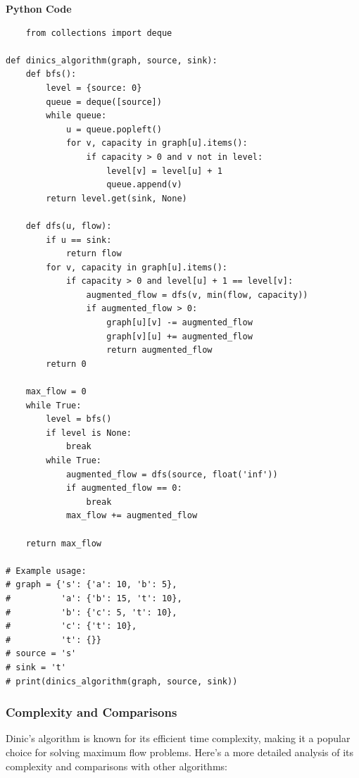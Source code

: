 \documentclass[12pt]{book} %
\begin{document}
\textbf{Python Code}
\FloatBarrier
\begin{lstlisting}
    from collections import deque

def dinics_algorithm(graph, source, sink):
    def bfs():
        level = {source: 0}
        queue = deque([source])
        while queue:
            u = queue.popleft()
            for v, capacity in graph[u].items():
                if capacity > 0 and v not in level:
                    level[v] = level[u] + 1
                    queue.append(v)
        return level.get(sink, None)

    def dfs(u, flow):
        if u == sink:
            return flow
        for v, capacity in graph[u].items():
            if capacity > 0 and level[u] + 1 == level[v]:
                augmented_flow = dfs(v, min(flow, capacity))
                if augmented_flow > 0:
                    graph[u][v] -= augmented_flow
                    graph[v][u] += augmented_flow
                    return augmented_flow
        return 0

    max_flow = 0
    while True:
        level = bfs()
        if level is None:
            break
        while True:
            augmented_flow = dfs(source, float('inf'))
            if augmented_flow == 0:
                break
            max_flow += augmented_flow

    return max_flow

# Example usage:
# graph = {'s': {'a': 10, 'b': 5},
#          'a': {'b': 15, 't': 10},
#          'b': {'c': 5, 't': 10},
#          'c': {'t': 10},
#          't': {}}
# source = 's'
# sink = 't'
# print(dinics_algorithm(graph, source, sink))
\end{lstlisting}
\FloatBarrier
\subsubsection{Complexity and Comparisons}
Dinic's algorithm is known for its efficient time complexity, making it a popular choice for solving maximum flow problems. Here's a more detailed analysis of its complexity and comparisons with other algorithms:
\end{document}
